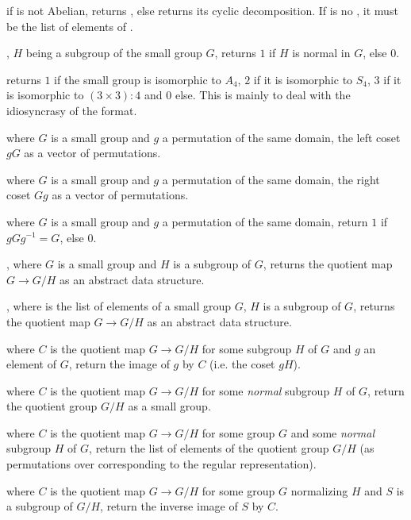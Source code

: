  if  is not Abelian,
returns , else returns its cyclic decomposition. If  is no
, it must be the list of elements of .

, $H$ being a subgroup of the
small group $G$, returns $1$ if $H$ is normal in $G$, else $0$.

 returns $1$ if the small group
 is isomorphic to $A_4$, $2$ if it is isomorphic to $S_4$,
$3$ if it is isomorphic to $(3\times 3):4$ and
$0$ else. This is mainly to deal with the idiosyncrasy of the format.

 where $G$ is a small group and $g$ a
permutation of the same domain, the left coset $gG$ as a vector of
permutations.

 where $G$ is a small group and $g$ a
permutation of the same domain, the right coset $Gg$  as a vector of
permutations.

 where $G$ is a small group and
$g$ a permutation of the same domain, return $1$ if $gGg^{-1}=G$, else $0$.

, where $G$ is a small group and
$H$ is a subgroup of $G$, returns the quotient map $G\rightarrow G/H$
as an abstract data structure.

, where  is the list of
elements of a small group $G$, $H$ is a subgroup of $G$, returns the quotient
map $G\rightarrow G/H$ as an abstract data structure.

 where $C$ is the quotient map
$G\rightarrow G/H$ for some subgroup $H$ of $G$ and $g$ an element of $G$,
return the image of $g$ by $C$ (i.e. the coset $gH$).

 where $C$ is the quotient map
$G\rightarrow G/H$ for some \emph{normal} subgroup $H$ of $G$, return the
quotient group $G/H$ as a small group.

 where $C$ is the quotient map
$G\rightarrow G/H$ for some group $G$ and some \emph{normal} subgroup $H$ of $G$,
return the list of elements of the quotient group $G/H$ (as permutations over
corresponding to the regular representation).

 where $C$ is the
quotient map $G\rightarrow G/H$ for some group $G$ normalizing $H$ and $S$ is
a subgroup of $G/H$, return the inverse image of $S$ by $C$.

